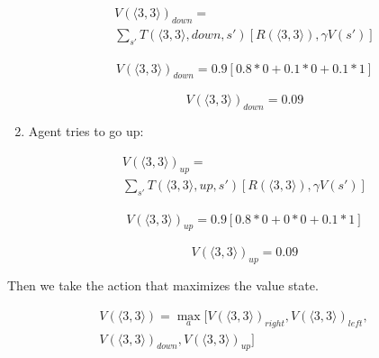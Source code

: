 \documentclass[10pt,a4paper,twocolumn]{article}
\begin{document}
\begin{enumerate}
				\begin{equation}
			\begin{split}
				V(\big \langle 3,3 \big \rangle)_{down} = \\ 
				\sum_{s'} T(\big \langle 3,3 \big \rangle, down, s') [R(\big \langle 3,3 \big \rangle), \gamma V(s')]
			\end{split}
		\end{equation}
		
		
		\begin{equation}
			\begin{split}
			V(\big \langle 3,3 \big \rangle)_{down} = 0.9[0.8 * 0 + 0.1 * 0 + 0.1 * 1]
			\end{split}
		\end{equation}
		
		\begin{equation}
			V(\big \langle 3,3 \big \rangle)_{down} = 0.09
		\end{equation}
		

		\item Agent tries to go up: 
		
		
		\begin{equation}
			\begin{split}
				V(\big \langle 3,3 \big \rangle)_{up} = \\ 
				\sum_{s'} T(\big \langle 3,3 \big \rangle, up, s') [R(\big \langle 3,3 \big \rangle), \gamma V(s')]
			\end{split}
		\end{equation}
		
		
		\begin{equation}
			\begin{split}
				V(\big \langle 3,3 \big \rangle)_{up} = 0.9[0.8 * 0 + 0 * 0 + 0.1 * 1]
			\end{split}
		\end{equation}
		
		\begin{equation}
			V(\big \langle 3,3 \big \rangle)_{up} = 0.09
		\end{equation}
		
	\end{enumerate}	
		
	Then we take the action that maximizes the value state. 
		
	\begin{equation}
		\begin{split}
		V(\big \langle 3,3 \big \rangle) = \max_{a} [V(\big \langle 3,3 \big 
		\rangle)_{right},V(\big \langle 3,3 \big \rangle)_{left},\\
		 V(\big \langle 3,3  \big \rangle)_{down}, V(\big \langle 3,3 \big \rangle)_{up}]
		\end{split}
	\end{equation}
\end{document}

